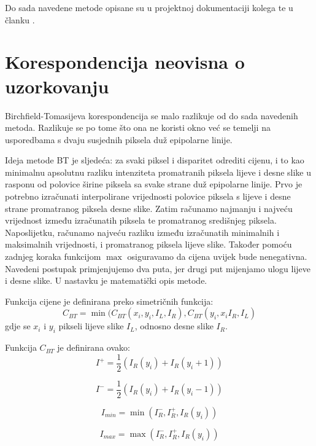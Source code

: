 \documentclass[utf8, zavrsni, numeric]{fer}
\begin{document}
Do sada navedene metode opisane su u projektnoj dokumentaciji kolega \cite{projekt1415} te u članku \cite{hirschmuller2007evaluation}.

\section{Korespondencija neovisna o uzorkovanju}

Birchfield-Tomasijeva korespondencija se malo razlikuje od do sada navedenih metoda.
Razlikuje se po tome što ona ne koristi okno već se temelji na usporedbama s dvaju susjednih piksela duž epipolarne linije.

Ideja metode BT je sljedeća: za svaki piksel i disparitet odrediti cijenu, i
to kao minimalnu apsolutnu razliku intenziteta promatranih piksela lijeve i desne slike u rasponu od polovice širine piksela sa svake strane duž epipolarne linije. Prvo je
potrebno izračunati interpolirane vrijednosti polovice piksela s lijeve i desne strane promatranog piksela desne slike. Zatim računamo najmanju i najveću vrijednost između izračunatih piksela te promatranog središnjeg piksela. Naposlijetku, računamo najveću razliku između izračunatih minimalnih i maksimalnih vrijednosti, i promatranog piksela lijeve slike.
Također pomoću zadnjeg koraka funkcijom $\max$ osiguravamo da cijena uvijek bude nenegativna. Navedeni postupak primjenjujemo dva puta, jer drugi put mijenjamo ulogu lijeve i desne slike. U nastavku je matematički opis metode.

Funkcija cijene je definirana preko simetričnih funkcija:
\[
C_{BT} = \min(C_{BT}(x_i, y_i, I_L, I_R), C_{BT}(y_i, x_i I_R, I_L)
\]
gdje se $x_i$ i $y_i$ pikseli lijeve slike $I_L$, odnosno desne slike $I_R$.

Funkcija $C_{BT}$ je definirana ovako:
\begin{equation}
I^+ = \frac{1}{2}(I_R(y_i) + I_R(y_i + 1))
\end{equation}

\begin{equation}
I^- = \frac{1}{2}(I_R(y_i) + I_R(y_i - 1))
\end{equation}

\begin{equation}
I_{min} = \min(I^-_R, I^+_R, I_R(y_i))
\end{equation}

\begin{equation}
I_{max} = \max(I^-_R, I^+_R, I_R(y_i))
\end{equation}
\end{document}
